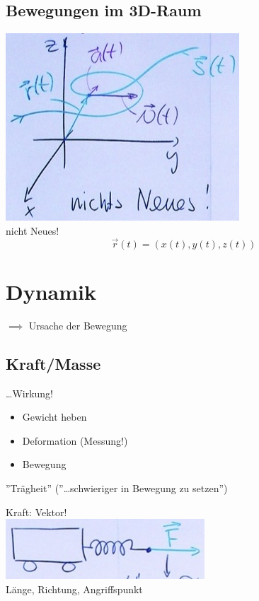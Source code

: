 \subsection{Bewegungen im 3D-Raum}
\includegraphics{Bild18} \\
nicht Neues!
\[ \vec{r}(t) = ( x(t) , y(t) , z(t) ) \]

\section{Dynamik}
$\implies$ Ursache der Bewegung
\subsection{Kraft/Masse}
\begin{def*}[ note = Kraft , index = Kraft ]
	\dots Wirkung!
\end{def*}
\begin{bsp*}
	\begin{itemize}
		\item Gewicht heben
		\item Deformation (Messung!)
		\item Bewegung
	\end{itemize}
\end{bsp*}
\begin{def*}[ note = Masse , index = Masse ]
	''Trägheit'' (''\dots schwieriger in Bewegung zu setzen'')
\end{def*}
Kraft: Vektor! \\
\includegraphics{Bild19} \\
Länge, Richtung, Angriffspunkt


